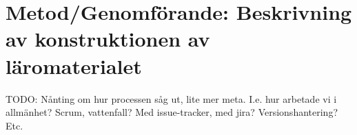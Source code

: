 



\chapter{Metod/Genomförande: Beskrivning av konstruktionen av läromaterialet}

%

TODO: Nånting om hur processen såg ut, lite mer meta. I.e. hur
arbetade vi i allmänhet? Scrum, vattenfall? Med issue-tracker, med
jira? Versionshantering? Etc.

